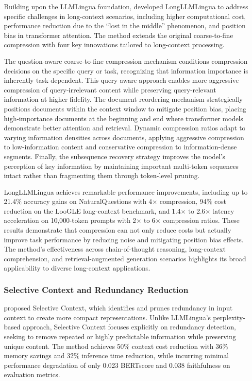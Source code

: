 Building upon the LLMLingua foundation, \citet{jiang2024longllmlingua} developed LongLLMLingua to address specific challenges in long-context scenarios, including higher computational cost, performance reduction due to the ``lost in the middle'' phenomenon, and position bias in transformer attention. The method extends the original coarse-to-fine compression with four key innovations tailored to long-context processing.

The question-aware coarse-to-fine compression mechanism conditions compression decisions on the specific query or task, recognizing that information importance is inherently task-dependent. This query-aware approach enables more aggressive compression of query-irrelevant content while preserving query-relevant information at higher fidelity. The document reordering mechanism strategically positions documents within the context window to mitigate position bias, placing high-importance documents at the beginning and end where transformer models demonstrate better attention and retrieval. Dynamic compression ratios adapt to varying information densities across documents, applying aggressive compression to low-information content and conservative compression to information-dense segments. Finally, the subsequence recovery strategy improves the model's perception of key information by maintaining important multi-token sequences intact rather than fragmenting them through token-level pruning.

LongLLMLingua achieves remarkable performance improvements, including up to 21.4\% accuracy gains on NaturalQuestions with 4$\times$ compression, 94\% cost reduction on the LooGLE long-context benchmark, and 1.4$\times$ to 2.6$\times$ latency acceleration on 10,000-token prompts with 2$\times$ to 6$\times$ compression ratios. These results demonstrate that compression can not only reduce costs but actually improve task performance by reducing noise and mitigating position bias effects. The method's effectiveness across chain-of-thought reasoning, long-context comprehension, and retrieval-augmented generation scenarios highlights its broad applicability to diverse long-context applications.

\subsubsection{Selective Context and Redundancy Reduction}

\citet{li2023compressing} proposed Selective Context, which identifies and prunes redundancy in input context to create more compact representations. Unlike LLMLingua's perplexity-based approach, Selective Context focuses explicitly on redundancy detection, seeking to remove repeated or highly predictable information while preserving unique content. The method achieves 50\% context cost reduction with 36\% memory savings and 32\% inference time reduction, while incurring minimal performance degradation of only 0.023 BERTscore and 0.038 faithfulness on evaluation metrics.

